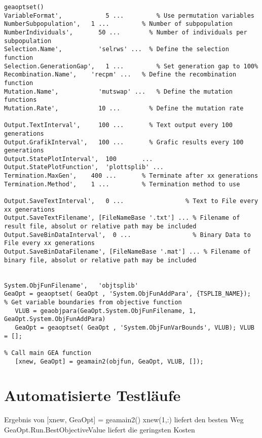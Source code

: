\begin{lstlisting}
geaoptset()
VariableFormat',            5 ...         % Use permutation variables  
NumberSubpopulation',   1 ...         % Number of subpopulation
NumberIndividuals',       50 ...        % Number of individuals per subpopulation
Selection.Name',          'selrws' ...  % Define the selection function
Selection.GenerationGap',   1 ...         % Set generation gap to 100%   
Recombination.Name',    'recpm' ...   % Define the recombination function
Mutation.Name',           'mutswap' ...   % Define the mutation functions
Mutation.Rate',           10 ...        % Define the mutation rate                   

Output.TextInterval',     100 ...       % Text output every 100 generations
Output.GrafikInterval',   100 ...       % Grafic results every 100 generations
Output.StatePlotInterval',  100       ...
Output.StatePlotFunction',  'plottsplib' ...
Termination.MaxGen',    400 ...       % Terminate after xx generations
Termination.Method',    1 ...         % Termination method to use

Output.SaveTextInterval',   0 ...                 % Text to File every xx generations
Output.SaveTextFilename', [FileNameBase '.txt'] ... % Filename of result file, absolut or relative path may be included
Output.SaveBinDataInterval',  0 ...                 % Binary Data to File every xx generations
Output.SaveBinDataFilename', [FileNameBase '.mat'] ... % Filename of binary file, absolut or relative path may be included


System.ObjFunFilename',   'objtsplib'
GeaOpt = geaoptset( GeaOpt , 'System.ObjFunAddPara', {TSPLIB_NAME});
% Get variable boundaries from objective function
   VLUB = geaobjpara(GeaOpt.System.ObjFunFilename, 1, GeaOpt.System.ObjFunAddPara)
   GeaOpt = geaoptset( GeaOpt , 'System.ObjFunVarBounds', VLUB); VLUB = [];

% Call main GEA function
   [xnew, GeaOpt] = geamain2(objfun, GeaOpt, VLUB, []);
\end{lstlisting}


\section{Automatisierte Testläufe}

Ergebnis von [xnew, GeaOpt] = geamain2()
xnew(1,:) liefert den besten Weg
GeaOpt.Run.BestObjectiveValue liefert die geringsten Kosten
